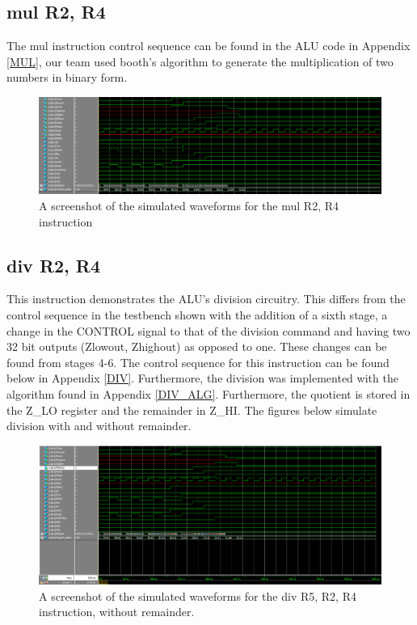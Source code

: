 \documentclass{article}
\begin{document}
    \subsection{mul R2, R4}
    
    The mul instruction control sequence can be found in the ALU code in Appendix \ref{MUL}, our team used booth's algorithm to generate the multiplication of two numbers in binary form. 
    
    \begin{figure}[h!]
        \begin{center}
            \includegraphics[width=13cm]{mul}
            \caption{A screenshot of the simulated waveforms for the mul R2, R4 instruction}
        \end{center}
    \end{figure}

    \subsection{div R2, R4}
    
    This instruction demonstrates the ALU's division circuitry. This differs from the control sequence in the testbench shown with the addition of a sixth stage, a change in the CONTROL signal to that of the division command and having two 32 bit outputs (Zlowout, Zhighout) as opposed to one. These changes can be found from stages 4-6. The control sequence for this instruction can be found below in Appendix \ref{DIV}. Furthermore, the division was implemented with the algorithm found in Appendix \ref{DIV_ALG}. Furthermore, the quotient is stored in the Z\_LO register and the remainder in Z\_HI. The figures below simulate division with and without remainder.
    
    \begin{figure}[h!]
        \begin{center}
            \includegraphics[width=13cm]{div}
            \caption{A screenshot of the simulated waveforms for the div R5, R2, R4 instruction, without remainder.}
        \end{center}
    \end{figure}
\end{document}
